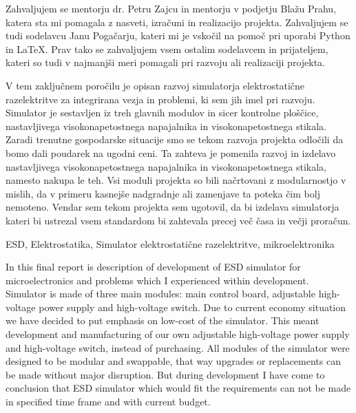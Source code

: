 \documentclass[a4paper,twoside,openright,12pt,Slovene]{book}
\date{Ljubljana, \the\year}
\begin{document}
\frontmatter


\maketitle

\zahvala
Zahvaljujem se mentorju dr. Petru Zajcu in mentorju v podjetju Blažu Prahu, katera sta mi pomagala z nasveti, izračuni in realizacijo projekta. Zahvaljujem se tudi sodelavcu Janu Pogačarju, kateri mi je vskočil na pomoč pri uporabi Python in LaTeX. Prav tako se zahvaljujem vsem ostalim sodelavcem in prijateljem, kateri so tudi v najmanjši meri pomagali pri razvoju ali realizaciji projekta.


\povzetek
V tem zaključnem poročilu je opisan razvoj simulatorja elektrostatične razelektritve za integrirana vezja in problemi, ki sem jih imel pri razvoju. Simulator je sestavljen iz treh glavnih modulov in sicer kontrolne ploščice, nastavljivega visokonapetostnega napajalnika in visokonapetostnega stikala.
Zaradi trenutne gospodarske situacije smo se tekom razvoja projekta odločili da bomo dali poudarek na ugodni ceni. Ta zahteva je pomenila razvoj in izdelavo nastavljivega visokonapetostnega napajalnika in visokonapetostnega stikala, namesto nakupa le teh. 
Vsi moduli projekta so bili načrtovani z modularnostjo v mislih, da v primeru kasnejše nadgradnje ali zamenjave ta poteka čim bolj nemoteno. Vendar sem tekom projekta sem ugotovil, da bi izdelava simulatorja kateri bi ustrezal vsem standardom bi zahtevala precej več časa in večji proračun.

\kljucnebesede
ESD, Elektrostatika, Simulator elektrostatične razelektritve, mikroelektronika



\abstract
In this final report is description of development of ESD simulator for microelectronics and problems which I experienced within development. Simulator is made of three main modules: main control board, adjustable high-voltage power supply and high-voltage switch. Due to current economy situation we have decided to put emphasis on low-cost of the simulator. This meant development and manufacturing of our own adjustable high-voltage power supply and high-voltage switch, instead of purchasing. All modules of the simulator were designed to be modular and swappable, that way upgrades or replacements can be made without major disruption. But during development I have come to conclusion that ESD simulator which would fit the requirements can not be made in specified time frame and with current budget.
\end{document}
